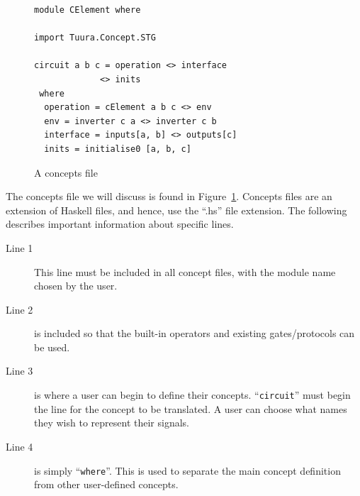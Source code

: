 \documentclass[british,conference,compsoc]{IEEEtran}
\begin{document}
\begin{figure}[h]
\begin{centering}

\begin{verbatim}
module CElement where

import Tuura.Concept.STG

circuit a b c = operation <> interface 
             <> inits 
 where
  operation = cElement a b c <> env
  env = inverter c a <> inverter c b
  interface = inputs[a, b] <> outputs[c] 
  inits = initialise0 [a, b, c]
\end{verbatim}

\par\end{centering}
\vspace{-2mm}
\begin{centering}
\protect\caption{\label{fig:concepts_file}A concepts file}
\vspace{-2mm}
\par\end{centering}

\end{figure}

The concepts file we will discuss is found in Figure~\ref{fig:concepts_file}.
Concepts files are an extension of Haskell files, and hence, use the ``.hs'' file extension.
The following describes important information about specific lines.

\begin{description}
  \item [Line 1]  This line must be included in all concept files, with the 
  module name chosen by the user.
  
  \item [Line 2] is included so that the built-in operators and existing 
  gates/protocols can be used. 
  
  \item [Line 3] is where a user can begin to define their concepts. 
  ``\texttt{circuit}'' must begin the line for the concept to be translated.
  A user can choose what names they wish to represent their signals.
  
  \item [Line 4] is simply ``\texttt{where}''. This is used to separate the main
  concept definition from other user-defined concepts.

\end{description}

\vspace{-1mm}
\end{document}
